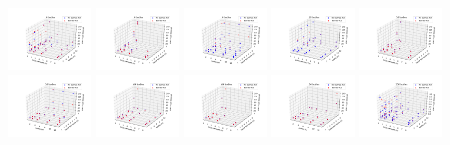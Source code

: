 \documentclass[11pt,a4paper]{article}
\begin{document}
\includegraphics[width=2.2cm]{4-cpusPerTask-nodes}
\includegraphics[width=2.2cm]{4-cpusPerTask-tasksPerNode}
\includegraphics[width=2.2cm]{4-nodes-tasksPerNode}
\includegraphics[width=2.2cm]{16-cpusPerTask-nodes}
\includegraphics[width=2.2cm]{16-cpusPerTask-tasksPerNode}
\includegraphics[width=2.2cm]{16-nodes-tasksPerNode}
\includegraphics[width=2.2cm]{64-cpusPerTask-nodes}
\includegraphics[width=2.2cm]{64-cpusPerTask-tasksPerNode}
\includegraphics[width=2.2cm]{64-nodes-tasksPerNode}
\includegraphics[width=2.2cm]{256-cpusPerTask-nodes}
\end{document}

